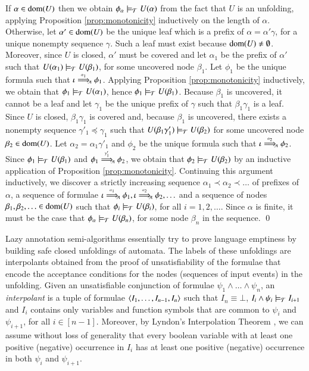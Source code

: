 \documentclass{llncs}
\begin{document}
{  If $\alpha \in \mathrm{dom}(U)$ then we obtain $\phi_{\alpha} \models_{\mathcal{T}}
  U(\alpha)$ from the fact that $U$ is an unfolding, applying
  Proposition \ref{prop:monotonicity} inductively on the length of
  $\alpha$. Otherwise, let $\alpha' \in \mathrm{dom}(U)$ be the unique leaf
  which is a prefix of $\alpha = \alpha'\gamma$, for a unique nonempty
  sequence $\gamma$. Such a leaf must exist because $\mathrm{dom}(U) \neq
  \emptyset$. Moreover, since $U$ is closed, $\alpha'$ must be covered
  and let $\alpha_1$ be the prefix of $\alpha'$ such that $U(\alpha_1)
  \models_{\mathcal{T}} U(\beta_1)$, for some uncovered node $\beta_1$. Let
  $\phi_1$ be the unique formula such that $\iota
  \stackrel{\scriptscriptstyle \alpha_1}{\Longrightarrow}_{\!\!\scriptscriptstyle \mathcal{A}} \phi_1$. Applying Proposition
  \ref{prop:monotonicity} inductively, we obtain that $\phi_1
  \models_{\mathcal{T}} U(\alpha_1)$, hence $\phi_1 \models_{\mathcal{T}} U(\beta_1)$.
  Because $\beta_1$ is uncovered, it cannot be a leaf and let
  $\gamma_1$ be the unique prefix of $\gamma$ such that
  $\beta_1\gamma_1$ is a leaf. Since $U$ is closed, $\beta_1\gamma_1$
  is covered and, because $\beta_1$ is uncovered, there exists a
  nonempty sequence $\gamma'_1 \preceq \gamma_1$ such that
  $U(\beta_1\gamma'_1) \models_{\mathcal{T}} U(\beta_2)$ for some uncovered node
  $\beta_2 \in \mathrm{dom}(U)$. Let $\alpha_2 = \alpha_1\gamma'_1$ and
  $\phi_2$ be the unique formula such that $\iota
  \stackrel{\scriptscriptstyle \alpha_2}{\Longrightarrow}_{\!\!\scriptscriptstyle \mathcal{A}} \phi_2$. Since $\phi_1 \models_{\mathcal{T}} U(\beta_1)$
  and $\phi_1 \stackrel{\scriptscriptstyle \gamma'_1}{\Longrightarrow}_{\!\!\scriptscriptstyle \mathcal{A}} \phi_2$, we obtain that $\phi_2
  \models_{\mathcal{T}} U(\beta_2)$ by an inductive application of Proposition
  \ref{prop:monotonicity}. Continuing this argument inductively, we
  discover a strictly increasing sequence $\alpha_1 \prec \alpha_2
  \prec \ldots$ of prefixes of $\alpha$, a sequence of formulae $\iota
  \stackrel{\scriptscriptstyle \alpha_1}{\Longrightarrow}_{\!\!\scriptscriptstyle \mathcal{A}} \phi_1, \iota \stackrel{\scriptscriptstyle \alpha_2}{\Longrightarrow}_{\!\!\scriptscriptstyle \mathcal{A}} \phi_2,
  \ldots$ and a sequence of nodes $\beta_1, \beta_2, \ldots \in
  \mathrm{dom}(U)$ such that $\phi_i \models_{\mathcal{T}} U(\beta_i)$, for all $i =
  1,2,\ldots$. Since $\alpha$ is finite, it must be the case that
  $\phi_\alpha \models_{\mathcal{T}} U(\beta_n)$, for some node $\beta_n$ in the
  sequence. \qed}

Lazy annotation semi-algorithms \cite{McMillan06,McMillan14}
essentially try to prove language emptiness by building safe closed
unfoldings of automata. The labels of these unfoldings are
interpolants obtained from the proof of unsatisfiability of the
formulae that encode the acceptance conditions for the nodes
(sequences of input events) in the unfolding. Given an unsatisfiable
conjunction of formulae $\psi_1 \wedge \ldots \wedge \psi_n$, an
\emph{interpolant} is a tuple of formulae
$\langle I_1,\ldots,I_{n-1},I_n \rangle$ such that $I_n \equiv \bot$, $I_i
\wedge \psi_i \models_{\mathcal{T}} I_{i+1}$ and $I_i$ contains only variables
and function symbols that are common to $\psi_i$ and $\psi_{i+1}$, for
all $i \in [n-1]$. Moreover, by Lyndon's Interpolation Theorem
\cite{Lyndon59}, we can assume without loss of generality that every
boolean variable with at least one positive (negative) occurrence in
$I_i$ has at least one positive (negative) occurrence in both $\psi_i$
and $\psi_{i+1}$.
\end{document}
